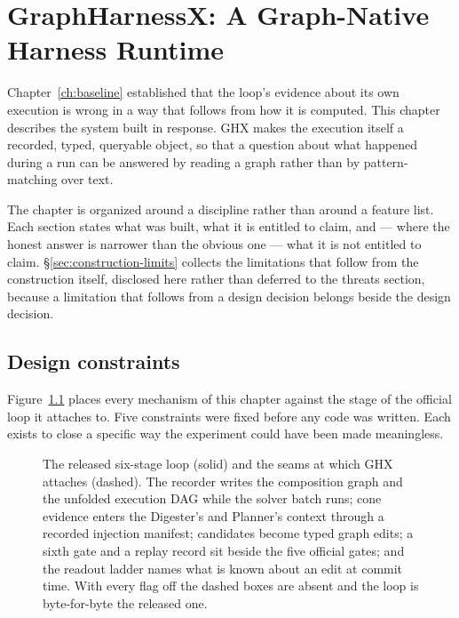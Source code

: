 \chapter{GraphHarnessX: A Graph-Native Harness Runtime}
\label{ch:ghx}


Chapter~\ref{ch:baseline} established that the loop's evidence about its
own execution is wrong in a way that follows from how it is computed. This
chapter describes the system built in response. GHX makes the execution
itself a recorded, typed, queryable object, so that a question about what
happened during a run can be answered by reading a graph rather than by
pattern-matching over text.

The chapter is organized around a discipline rather than around a feature
list. Each section states what was built, what it is entitled to claim, and
--- where the honest answer is narrower than the obvious one --- what it is
not entitled to claim. \S\ref{sec:construction-limits} collects the
limitations that follow from the construction itself, disclosed here rather
than deferred to the threats section, because a limitation that follows
from a design decision belongs beside the design decision.

\section{Design constraints}
\label{sec:constraints}

Figure~\ref{fig:loop} places every mechanism of this chapter against the
stage of the official loop it attaches to. Five constraints were fixed
before any code was written. Each exists to close a specific way the
experiment could have been made meaningless.

\begin{figure}[t]
\centering
\resizebox{\textwidth}{!}{}
\caption[The six-stage loop and where GHX attaches]{The released
six-stage loop (solid) and the seams at which GHX attaches (dashed).
The recorder writes the composition graph and the unfolded execution
DAG while the solver batch runs; cone evidence enters the Digester's and
Planner's context through a recorded injection manifest; candidates
become typed graph edits; a sixth gate and a replay record sit beside the
five official gates; and the readout ladder names what is known about an
edit at commit time. With every flag off the dashed boxes are absent and
the loop is byte-for-byte the released one.}
\label{fig:loop}
\end{figure}

